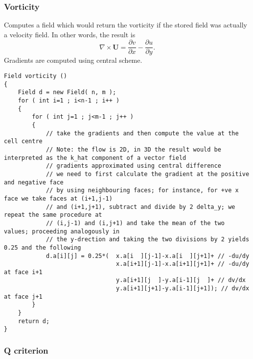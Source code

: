 \documentclass[notitlepage]{article}
\begin{document}
\subsubsection{Vorticity}

Computes a field which would return the vorticity if the stored
field was actually a velocity field. In other words, the result is
%
\begin{equation}
\nabla \times \mathbf{U} = \frac{\partial v}{\partial x} - \frac{\partial u}{\partial y}.
\end{equation}
%
Gradients are computed using central scheme.

\begin{lstlisting}[style=myCpp]
Field vorticity ()
{
	Field d = new Field( n, m );
	for ( int i=1 ; i<n-1 ; i++ )
	{
		for ( int j=1 ; j<m-1 ; j++ )
		{
			// take the gradients and then compute the value at the cell centre
			// Note: the flow is 2D, in 3D the result would be interpreted as the k_hat component of a vector field
			// gradients approximated using central difference
			// we need to first calculate the gradient at the positive and negative face
			// by using neighbouring faces; for instance, for +ve x face we take faces at (i+1,j-1)
			// and (i+1,j+1), subtract and divide by 2 delta_y; we repeat the same procedure at
			// (i,j-1) and (i,j+1) and take the mean of the two values; proceeding analogously in
			// the y-drection and taking the two divisions by 2 yields 0.25 and the following
			d.a[i][j] = 0.25*(	x.a[i  ][j-1]-x.a[i  ][j+1]+ // -du/dy
								x.a[i+1][j-1]-x.a[i+1][j+1]+ // -du/dy at face i+1
								y.a[i+1][j  ]-y.a[i-1][j  ]+ // dv/dx
								y.a[i+1][j+1]-y.a[i-1][j+1]); // dv/dx at face j+1
		}
	}
	return d;
}
\end{lstlisting}

\subsubsection{Q criterion}
\end{document}

